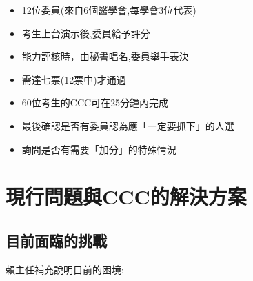 \documentclass[12pt,a4paper]{article}
\begin{document}
\begin{itemize}[leftmargin=*]
    \item 12位委員(來自6個醫學會,每學會3位代表)
    \item 考生上台演示後,委員給予評分
    \item 能力評核時，由秘書唱名,委員舉手表決
    \item 需達七票(12票中)才通過
    \item 60位考生的CCC可在25分鐘內完成
    \item 最後確認是否有委員認為應「一定要抓下」的人選
    \item 詢問是否有需要「加分」的特殊情況
\end{itemize}

\section{現行問題與CCC的解決方案}

\subsection{目前面臨的挑戰}

賴主任補充說明目前的困境:
\end{document}
